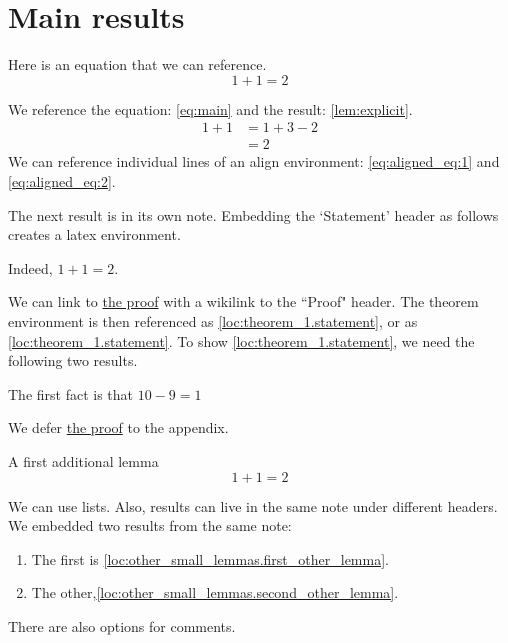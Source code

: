 \documentclass{article}
\begin{document}
\section{Main results}
\label{loc:body.main_results}
Here is an equation that we can reference.
\begin{equation}
\label{eq:main}
1+1 = 2
\end{equation}
\begin{lemma}
\label{lem:explicit}
We reference the equation: \cref{eq:main} and the result: \cref{lem:explicit}.
\begin{align}
1+1 & = 1+3-2 \label{eq:aligned_eq:1}\\
& = 2 \label{eq:aligned_eq:2}
\end{align}
We can reference individual lines of an align environment: \cref{eq:aligned_eq:1} and \cref{eq:aligned_eq:2}.
\end{lemma}
The next result is in its own note. Embedding the `Statement' header as follows creates a latex environment.
\begin{theorem}
\label{loc:theorem_1.statement}
Indeed, $1+1  =  2$.
\end{theorem}
We can link to \hyperlink{loc:theorem_1.proof}{the proof} with a wikilink to the ``Proof" header.
The theorem environment is then referenced as \cref{loc:theorem_1.statement}, or as \cref{loc:theorem_1.statement}. To show \cref{loc:theorem_1.statement}, we need the following two results.
\begin{lemma}
\label{loc:lemma_1.statement}
The first fact is that $10-9 = 1$
\end{lemma}
We defer \hyperlink{loc:lemma_1.proof}{the proof} to the appendix.
\begin{lemma}
\label{loc:other_small_lemmas.first_other_lemma}
A first additional lemma
\begin{equation*}
1+1 = 2
\end{equation*}
\end{lemma}
We can use lists. Also, results can live in the same note under different headers. We embedded two results from the same note: 
\begin{enumerate}
\item The first is \cref{loc:other_small_lemmas.first_other_lemma}.
\item The other,\cref{loc:other_small_lemmas.second_other_lemma}.
\end{enumerate}

There are also options for comments.
\end{document}

